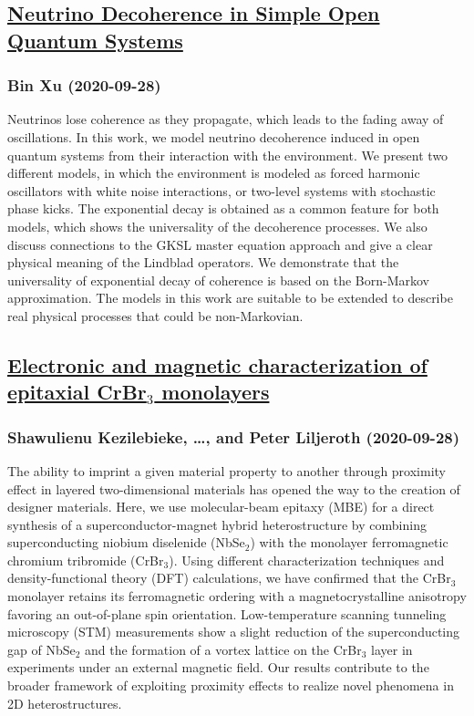 \subsection*{\href{http://arxiv.org/abs/2009.13471v1}{Neutrino Decoherence in Simple Open Quantum Systems}}
\subsubsection*{Bin Xu (2020-09-28)}
Neutrinos lose coherence as they propagate, which leads to the fading away of
oscillations. In this work, we model neutrino decoherence induced in open
quantum systems from their interaction with the environment. We present two
different models, in which the environment is modeled as forced harmonic
oscillators with white noise interactions, or two-level systems with stochastic
phase kicks. The exponential decay is obtained as a common feature for both
models, which shows the universality of the decoherence processes. We also
discuss connections to the GKSL master equation approach and give a clear
physical meaning of the Lindblad operators. We demonstrate that the
universality of exponential decay of coherence is based on the Born-Markov
approximation. The models in this work are suitable to be extended to describe
real physical processes that could be non-Markovian.

\subsection*{\href{http://arxiv.org/abs/2009.13465v1}{Electronic and magnetic characterization of epitaxial CrBr$_3$  monolayers}}
\subsubsection*{Shawulienu Kezilebieke, \dots, and Peter Liljeroth (2020-09-28)}
The ability to imprint a given material property to another through proximity
effect in layered two-dimensional materials has opened the way to the creation
of designer materials. Here, we use molecular-beam epitaxy (MBE) for a direct
synthesis of a superconductor-magnet hybrid heterostructure by combining
superconducting niobium diselenide (NbSe$_2$) with the monolayer ferromagnetic
chromium tribromide (CrBr$_3$). Using different characterization techniques and
density-functional theory (DFT) calculations, we have confirmed that the
CrBr$_3$ monolayer retains its ferromagnetic ordering with a magnetocrystalline
anisotropy favoring an out-of-plane spin orientation. Low-temperature scanning
tunneling microscopy (STM) measurements show a slight reduction of the
superconducting gap of NbSe$_2$ and the formation of a vortex lattice on the
CrBr$_3$ layer in experiments under an external magnetic field. Our results
contribute to the broader framework of exploiting proximity effects to realize
novel phenomena in 2D heterostructures.

